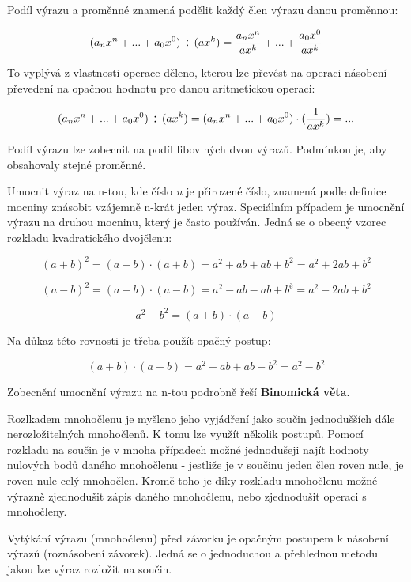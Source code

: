 
Podíl výrazu a proměnné znamená podělit každý člen výrazu danou proměnnou:

$$ (a_{n}x^{n}+...+a_0x^{0}) \div (ax^{k}) = {{a_nx^{n}}\over{ax^{k}}}+...+{{a_{0}x^{0}}\over{ax^{k}}} $$

To vyplývá z vlastnosti operace děleno, kterou lze převést na operaci násobení převedení na opačnou hodnotu pro danou aritmetickou operaci:

$$(a_{n}x^{n}+...+a_0x^{0}) \div (ax^{k}) = (a_{n}x^{n}+...+a_0x^{0}) \cdot ({{1} \over {ax^{k}}}) = ...  $$


Podíl výrazu lze zobecnit na podíl libovlných dvou výrazů. Podmínkou je, aby obsahovaly stejné proměnné.


Umocnit výraz na n-tou, kde číslo {\it n} je přirozené číslo, znamená podle definice mocniny znásobit vzájemně n-krát jeden výraz. Speciálním případem je umocnění výrazu na druhou mocninu, který je často používán. Jedná se o obecný vzorec rozkladu kvadratického dvojčlenu:

$$ (a + b)^2 = (a + b) \cdot (a + b) = a^2 + ab + ab + b^2 = a^2 +2ab +b^2 $$

$$ (a-b)^2 = (a-b) \cdot (a-b) = a^2 -ab -ab +b^ě = a^2 -2ab + b^2 $$

$$ a^2-b^2 = (a + b) \cdot (a-b) $$

Na důkaz této rovnosti je třeba použít opačný postup:

$$ (a + b) \cdot (a-b) = a^2 -ab +ab -b^2 = a^2-b^2 $$

Zobecnění umocnění výrazu na n-tou podrobně řeší {\bf Binomická věta}.


Rozlkadem mnohočlenu je myšleno jeho vyjádření jako součin jednodušších dále nerozložitelných mnohočlenů. K tomu lze využít několik postupů. Pomocí rozkladu na součin je v mnoha případech možné jednodušeji najít hodnoty nulových bodů daného mnohočlenu - jestliže je v součinu jeden člen roven nule, je roven nule celý mnohočlen. Kromě toho je díky rozkladu mnohočlenu možné výrazně zjednodušit zápis daného mnohočlenu, nebo zjednodušit operaci s mnohočleny.


Vytýkání výrazu (mnohočlenu) před závorku je opačným postupem k násobení výrazů (roznásobení závorek). Jedná se o jednoduchou a přehlednou metodu jakou lze výraz rozložit na součin. 

